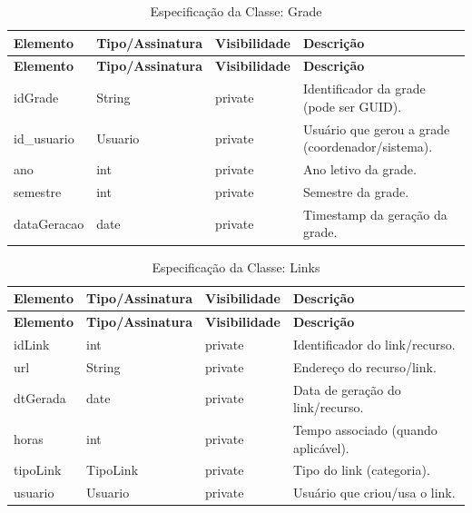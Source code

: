 \fonteautores

\vspace{\baselineskip}

\Needspace{0.32\textheight}
\begin{longtable}{|L{3.5cm}|L{3.5cm}|L{3.5cm}|L{3.5cm}|}
\caption{Especificação da Classe: Grade} \\
\hline
\textbf{Elemento} & \textbf{Tipo/Assinatura} & \textbf{Visibilidade} & \textbf{Descrição} \\
\hline
\endfirsthead
\hline
\textbf{Elemento} & \textbf{Tipo/Assinatura} & \textbf{Visibilidade} & \textbf{Descrição} \\
\hline
\endhead
idGrade & String & private & Identificador da grade (pode ser GUID). \\
\hline
id\_usuario & Usuario & private & Usuário que gerou a grade (coordenador/sistema). \\
\hline
ano & int & private & Ano letivo da grade. \\
\hline
semestre & int & private & Semestre da grade. \\
\hline
dataGeracao & date & private & Timestamp da geração da grade. \\
\hline
\end{longtable}

\fonteautores

\vspace{\baselineskip}

\Needspace{0.32\textheight}
\begin{longtable}{|L{3.5cm}|L{3.5cm}|L{3.5cm}|L{3.5cm}|}
\caption{Especificação da Classe: Links} \\
\hline
\textbf{Elemento} & \textbf{Tipo/Assinatura} & \textbf{Visibilidade} & \textbf{Descrição} \\
\hline
\endfirsthead
\hline
\textbf{Elemento} & \textbf{Tipo/Assinatura} & \textbf{Visibilidade} & \textbf{Descrição} \\
\hline
\endhead
idLink & int & private & Identificador do link/recurso. \\
\hline
url & String & private & Endereço do recurso/link. \\
\hline
dtGerada & date & private & Data de geração do link/recurso. \\
\hline
horas & int & private & Tempo associado (quando aplicável). \\
\hline
tipoLink & TipoLink & private & Tipo do link (categoria). \\
\hline
usuario & Usuario & private & Usuário que criou/usa o link. \\
\hline
\end{longtable}

